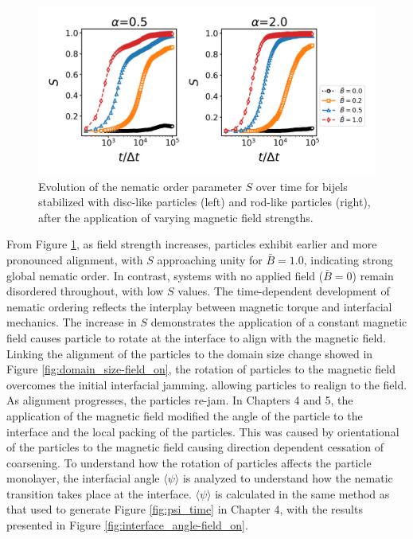 \begin{figure} 
    \centering 
    \includegraphics[scale=0.6]{../figures/results/paper2/nematic-field_on.png} 
    \caption{Evolution of the nematic order parameter \( S \) over time for bijels stabilized with disc-like particles (left) and rod-like particles (right), 
             after the application of varying magnetic field strengths.} 
    \label{fig:nematic-field_on} 
\end{figure}

From Figure \ref{fig:nematic-field_on}, as field strength increases, particles exhibit earlier and more pronounced alignment, with \( S \) approaching unity 
for \( \bar{B} = 1.0 \), indicating strong global nematic order. In contrast, systems with no applied field (\( \bar{B} = 0 \)) remain disordered throughout, 
with low \( S \) values. The time-dependent development of nematic ordering reflects the interplay between magnetic torque and interfacial mechanics. 
The increase in \( S \) demonstrates the application of a constant magnetic field causes particle to rotate at the interface to align with the magnetic field.
Linking the alignment of the particles to the domain size change showed in Figure \ref{fig:domain_size-field_on}, the rotation of particles to the magnetic field 
overcomes the initial interfacial jamming. allowing particles to realign to the field. As alignment 
progresses, the particles re-jam. In Chapters 4 and 5, the application of the magnetic field modified the angle of the particle to the interface and the
local packing of the particles. This was caused by orientational of the particles to the magnetic field causing direction dependent cessation of coarsening.
To understand how the rotation of particles affects the particle monolayer, the interfacial angle $\langle \psi \rangle$ is analyzed to understand
how the nematic transition takes place at the interface. $\langle \psi \rangle$ is calculated in the same method as that used to generate Figure \ref{fig:psi_time} 
in Chapter 4, with the results presented in Figure \ref{fig:interface_angle-field_on}. 

